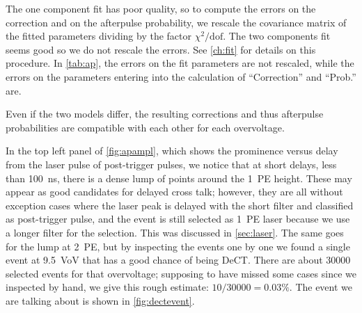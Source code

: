 \begin{table}
    
\end{table}

\begin{figure}
    


\end{figure}

The one component fit has poor quality, so to compute the errors on the
correction and on the afterpulse probability, we rescale the covariance matrix
of the fitted parameters dividing by the factor $\chi^2/\text{dof}$. The two
components fit seems good so we do not rescale the errors. See \autoref{ch:fit}
for details on this procedure. In \autoref{tab:ap}, the errors on the fit
parameters are not rescaled, while the errors on the parameters entering into
the calculation of ``Correction'' and ``Prob.'' are.

Even if the two models differ, the resulting corrections and thus afterpulse
probabilities are compatible with each other for each overvoltage.


In the top left panel of \autoref{fig:apampl}, which shows the prominence
versus delay from the laser pulse of post-trigger pulses, we notice that at
short delays, less than \SI{100}{ns}, there is a dense lump of points around
the 1~PE height. These may appear as good candidates for delayed cross talk;
however, they are all without exception cases where the laser peak is delayed
with the short filter and classified as post-trigger pulse, and the event is
still selected as 1~PE laser because we use a longer filter for the selection.
This was discussed in \autoref{sec:laser}. The same goes for the lump at 2~PE,
but by inspecting the events one by one we found a single event at
\SI{9.5}{VoV} that has a good chance of being DeCT. There are about \num{30000}
selected events for that overvoltage; supposing to have missed some cases since
we inspected by hand, we give this rough estimate: $10/\num{30000} =
\SI{0.03}\%$. The event we are talking about is shown in
\autoref{fig:dectevent}.

